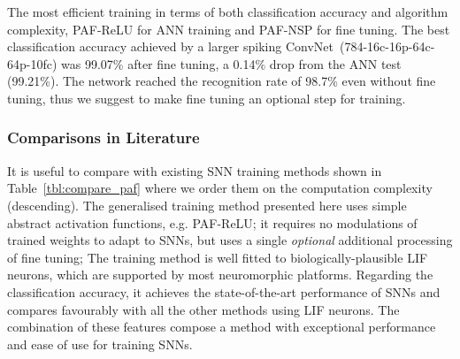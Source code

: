 	
	
	
	The most efficient training in terms of both classification accuracy and algorithm complexity, \DIFdelbegin {}\DIFdelend \DIFaddbegin {}\DIFaddend PAF-ReLU for ANN training and PAF-NSP for fine tuning.
	The best classification accuracy achieved by a larger spiking ConvNet~(784-16c-16p-64c-64p-10fc) was 99.07\% after fine tuning, a 0.14\% drop from the ANN test (99.21\%).
	The network reached the recognition rate of 98.7\% even without fine tuning, thus we suggest to make fine tuning an optional step for training.

	\subsubsection{Comparisons in Literature}
	It is useful to compare with existing SNN training methods shown in Table~\ref{tbl:compare_paf} where we order them on the computation complexity (descending).
	The generalised training method presented here uses simple abstract activation functions, e.g. PAF-ReLU;
	it requires no modulations of trained weights to adapt to SNNs, but uses a single \emph{optional} additional processing of fine tuning;
	The training method is well fitted to biologically-plausible LIF neurons, which are supported by most neuromorphic platforms.
	Regarding the classification accuracy, it achieves the state-of-the-art performance of SNNs and compares favourably with all the other methods using LIF neurons.
	The combination of these features compose a method with exceptional performance and ease of use for training SNNs.

